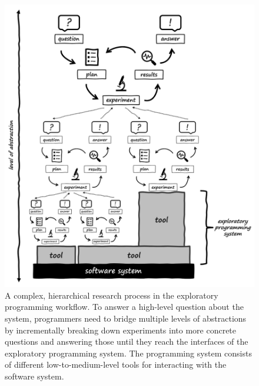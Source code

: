 \begin{figure}
	\centering
	\includegraphics[width=\textwidth]{01_exp/complex_process.png}
	\caption[A hierarchical research process in the exploratory programming workflow.]{
		A complex, hierarchical research process in the exploratory programming workflow.
		To answer a high-level question about the system, programmers need to bridge multiple levels of abstractions by incrementally breaking down experiments into more concrete questions and answering those until they reach the interfaces of the exploratory programming system.
		The programming system consists of different low-to-medium-level tools for interacting with the software system.
	}
	\label{fig:background/exp/complex_process}
\end{figure}

